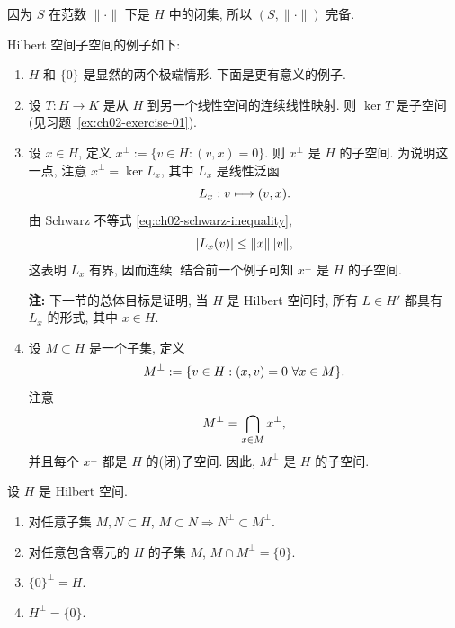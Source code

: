 \begin{Proof}
因为 $S$ 在范数 $\|\cdot\|$ 下是 $H$ 中的闭集, 所以 $(S,\|\cdot\|)$ 完备.
\end{Proof}

\begin{Example}
\label{ex:ch02-hilbert-subspaces}
Hilbert 空间子空间的例子如下:
\begin{enumerate}
\item[(i)] $H$ 和 $\{0\}$ 是显然的两个极端情形. 下面是更有意义的例子.
\item[(ii)] 设 $T:H\longrightarrow K$ 是从 $H$ 到另一个线性空间的连续线性映射. 则 $\ker T$ 是子空间(见习题~\ref{ex:ch02-exercise-01}).
\item[(iii)] 设 $x\in H$, 定义 $x^\perp:=\{v\in H:(v,x)=0\}$. 则 $x^\perp$ 是 $H$ 的子空间. 为说明这一点, 注意 $x^\perp=\ker L_x$, 其中 $L_x$ 是线性泛函
\setcounter{equation}{5}
\begin{equation}
\MathBookFormulaID{formula-ch02-lx-functional}
L_x:v\longmapsto(v,x).
\label{eq:ch02-lx-functional}
\end{equation}
由 Schwarz 不等式 \eqref{eq:ch02-schwarz-inequality},
\[
\MathBookFormulaID{formula-ch02-lx-bound}
|L_x(v)|\leq\|x\|\|v\|,
\]
这表明 $L_x$ 有界, 因而连续. 结合前一个例子可知 $x^\perp$ 是 $H$ 的子空间.

\textbf{注:} 下一节的总体目标是证明, 当 $H$ 是 Hilbert 空间时, 所有 $L\in H'$ 都具有 $L_x$ 的形式, 其中 $x\in H$.
\item[(iv)] 设 $M\subset H$ 是一个子集, 定义
\[
\MathBookFormulaID{formula-ch02-orthogonal-complement}
M^\perp:=\{v\in H:(x,v)=0\ \forall x\in M\}.
\]
注意
\[
\MathBookFormulaID{formula-ch02-orthogonal-intersection}
M^\perp=\bigcap_{x\in M}x^\perp,
\]
并且每个 $x^\perp$ 都是 $H$ 的(闭)子空间. 因此, $M^\perp$ 是 $H$ 的子空间.
\end{enumerate}
\end{Example}

\setcounter{thmcount}{6}
\begin{Proposition}
\label{prop:ch02-orthogonal-complement-properties}
设 $H$ 是 Hilbert 空间.
\begin{enumerate}
\item[(1)] 对任意子集 $M,N\subset H$, $M\subset N\Longrightarrow N^\perp\subset M^\perp$.
\item[(2)] 对任意包含零元的 $H$ 的子集 $M$, $M\cap M^\perp=\{0\}$.
\item[(3)] $\{0\}^\perp=H$.
\item[(4)] $H^\perp=\{0\}$.
\end{enumerate}
\end{Proposition}

